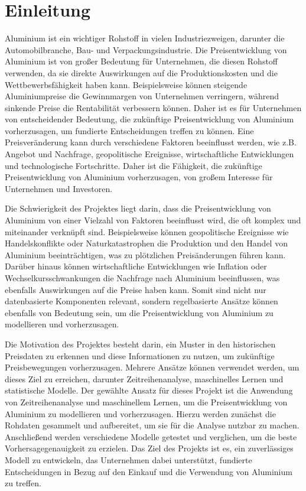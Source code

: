 \section{Einleitung}
\label{sec:einleitung}

Aluminium ist ein wichtiger Rohstoff in vielen Industriezweigen, darunter die Automobilbranche, Bau- und Verpackungsindustrie. Die Preisentwicklung von Aluminium ist von großer Bedeutung für Unternehmen, die diesen Rohstoff verwenden, da sie direkte 
Auswirkungen auf die Produktionskosten und die Wettbewerbsfähigkeit haben kann. Beispielsweise können steigende Aluminiumpreise die Gewinnmargen von Unternehmen verringern, während sinkende Preise die Rentabilität verbessern können. Daher ist es für Unternehmen von entscheidender Bedeutung, die zukünftige Preisentwicklung von Aluminium vorherzusagen, um fundierte Entscheidungen treffen zu können. Eine Preisveränderung kann durch verschiedene Faktoren beeinflusst werden, wie z.B. Angebot und Nachfrage, geopolitische Ereignisse, wirtschaftliche Entwicklungen und technologische Fortschritte. Daher ist die Fähigkeit, die zukünftige Preisentwicklung von Aluminium vorherzusagen, von großem Interesse für Unternehmen und Investoren.

Die Schwierigkeit des Projektes liegt darin, dass die Preisentwicklung von Aluminium von einer Vielzahl von Faktoren beeinflusst wird, die oft komplex und miteinander verknüpft sind. Beispielsweise können geopolitische Ereignisse wie Handelskonflikte oder Naturkatastrophen die Produktion und den Handel von Aluminium beeinträchtigen, was zu plötzlichen Preisänderungen führen kann. Darüber hinaus können wirtschaftliche Entwicklungen wie Inflation oder Wechselkursschwankungen die Nachfrage nach Aluminium beeinflussen, was ebenfalls Auswirkungen auf die Preise haben kann. Somit sind nicht nur datenbasierte Komponenten relevant, sondern regelbasierte Ansätze können ebenfalls von Bedeutung sein, um die Preisentwicklung von Aluminium zu modellieren und vorherzusagen.

Die Motivation des Projektes besteht darin, ein Muster in den historischen Preisdaten zu erkennen und diese Informationen zu nutzen, um zukünftige Preisbewegungen vorherzusagen. Mehrere Ansätze können verwendet werden, um dieses Ziel zu erreichen, darunter Zeitreihenanalyse, maschinelles Lernen und statistische Modelle. Der gewählte Ansatz für dieses Projekt ist die Anwendung von Zeitreihenanalyse und maschinellem Lernen, um die Preisentwicklung von Aluminium zu modellieren und vorherzusagen. Hierzu werden zunächst die Rohdaten gesammelt und aufbereitet, um sie für die Analyse nutzbar zu machen. Anschließend werden verschiedene Modelle getestet und verglichen, um die beste Vorhersagegenauigkeit zu erzielen. Das Ziel des Projekts ist es, ein zuverlässiges Modell zu entwickeln, das Unternehmen dabei unterstützt, fundierte Entscheidungen in Bezug auf den Einkauf und die Verwendung von Aluminium zu treffen.

